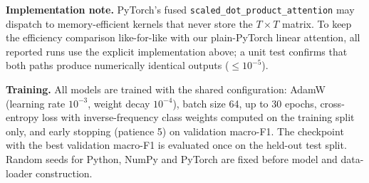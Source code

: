 \textbf{Implementation note.} PyTorch's fused
\texttt{scaled\_dot\_product\_attention} may dispatch to memory-efficient
kernels that never store the $T \times T$ matrix. To keep the efficiency
comparison like-for-like with our plain-PyTorch linear attention, all
reported runs use the explicit implementation above; a unit test confirms
that both paths produce numerically identical outputs ($\le 10^{-5}$).

\textbf{Training.} All models are trained with the shared configuration:
AdamW (learning rate $10^{-3}$, weight decay $10^{-4}$), batch size 64,
up to 30 epochs, cross-entropy loss with inverse-frequency class weights
computed on the training split only, and early stopping (patience 5) on
validation macro-F1. The checkpoint with the best validation macro-F1 is
evaluated once on the held-out test split. Random seeds for Python, NumPy
and PyTorch are fixed before model and data-loader construction.

